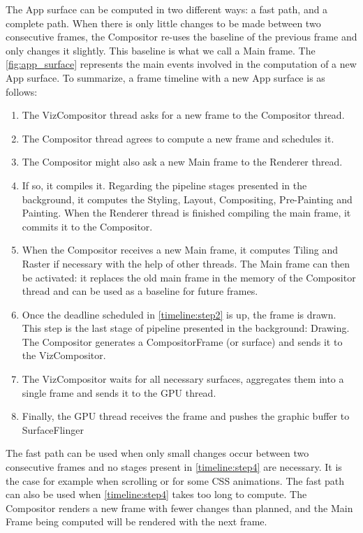 \documentclass{kththesis}
\begin{document}
The App surface can be computed in two different ways: a fast path, and a complete path. When there is only little changes to be made between two consecutive frames, the Compositor re-uses the baseline of the previous frame and only changes it slightly. This baseline is what we call a Main frame.
The \autoref{fig:app_surface} represents the main events involved in the computation of a new App surface. To summarize, a frame timeline with a new App surface is as follows:
\begin{enumerate}[ref={Step}\xspace\arabic*]
    \item \label{timeline:step1} The VizCompositor thread asks for a new frame to the Compositor thread.
    \item \label{timeline:step2} The Compositor thread agrees to compute a new frame and schedules it.
    \item \label{timeline:step3}The Compositor might also ask a new Main frame to the Renderer thread.
    \item \label{timeline:step4}If so, it compiles it. Regarding the pipeline stages presented in the background, it computes the Styling, Layout, Compositing, Pre-Painting and Painting. When the Renderer thread is finished compiling the main frame, it commits it to the Compositor.
    \item \label{timeline:step5}When the Compositor receives a new Main frame, it computes Tiling and Raster if necessary with the help of other threads. The Main frame can then be activated: it replaces the old main frame in the memory of the Compositor thread and can be used as a baseline for future frames.
    \item \label{timeline:step6} Once the deadline scheduled in \ref{timeline:step2} is up, the frame is drawn. This step is the last stage of pipeline presented in the background: Drawing. The Compositor generates a CompositorFrame (or surface) and sends it to the VizCompositor.
    \item \label{timeline:step7}The VizCompositor waits for all necessary surfaces, aggregates them into a single frame and sends it to the GPU thread.
    \item \label{timeline:step8}Finally, the GPU thread receives the frame and pushes the graphic buffer to SurfaceFlinger
\end{enumerate}

The fast path can be used when only small changes occur between two consecutive frames and no stages present in \ref{timeline:step4} are necessary. It is the case for example when scrolling or for some CSS animations. The fast path can also be used when \ref{timeline:step4} takes too long to compute. The Compositor renders a new frame with fewer changes than planned, and the Main Frame being computed will be rendered with the next frame.
\end{document}
